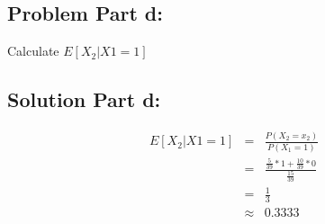 \documentclass[12pt]{article}%
\begin{document}
\subsection*{Problem Part d:}
Calculate $E[X_2|X1 = 1]$
\subsection*{Solution Part d:}
\begin{eqnarray*}
E[X_2|X1 = 1] & = & \frac{P(X_2 = x_2)}{P(X_1=1)} \\
	   & = & \frac{\frac{5}{39}*1+\frac{10}{39}*0}{\frac{15}{39}} \\
	   & = & \frac{1}{3} \\
	   & \approx & 0.3333
\end{eqnarray*}
\end{document}
